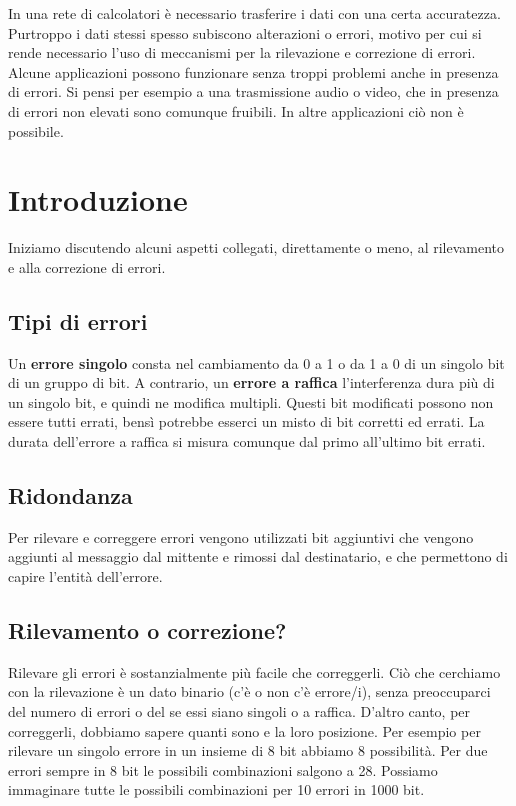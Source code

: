 In una rete di calcolatori è necessario trasferire i dati con una certa accuratezza. Purtroppo i dati stessi spesso subiscono alterazioni o errori, motivo per cui si rende necessario l'uso di meccanismi per la rilevazione e correzione di errori. Alcune applicazioni possono funzionare senza troppi problemi anche in presenza di errori. Si pensi per esempio a una trasmissione audio o video, che in presenza di errori non elevati sono comunque fruibili. In altre applicazioni ciò non è possibile.

\section{Introduzione}
    Iniziamo discutendo alcuni aspetti collegati, direttamente o meno, al rilevamento e alla correzione di errori.
    
    \subsection{Tipi di errori}
        Un \textbf{errore singolo} consta nel cambiamento da 0 a 1 o da 1 a 0 di un singolo bit di un gruppo di bit. A contrario, un \textbf{errore a raffica} l'interferenza dura più di un singolo bit, e quindi ne modifica multipli. Questi bit modificati possono non essere tutti errati, bensì potrebbe esserci un misto di bit corretti ed errati. La durata dell'errore a raffica si misura comunque dal primo all'ultimo bit errati.
        
    \subsection{Ridondanza}
        Per rilevare e correggere errori vengono utilizzati bit aggiuntivi che vengono aggiunti al messaggio dal mittente e rimossi dal destinatario, e che permettono di capire l'entità dell'errore.
        
    \subsection{Rilevamento o correzione?}
        Rilevare gli errori è sostanzialmente più facile che correggerli. Ciò che cerchiamo con la rilevazione è un dato binario (c'è o non c'è errore/i), senza preoccuparci del numero di errori o del se essi siano singoli o a raffica. D'altro canto, per correggerli, dobbiamo sapere quanti sono e la loro posizione. Per esempio per rilevare un singolo errore in un insieme di 8 bit abbiamo 8 possibilità. Per due errori sempre in 8 bit le possibili combinazioni salgono a 28. Possiamo immaginare tutte le possibili combinazioni per 10 errori in 1000 bit.
        
